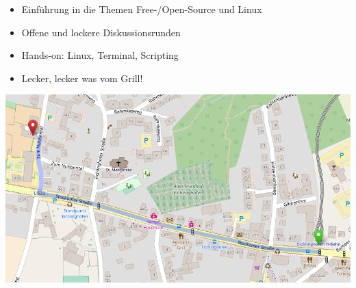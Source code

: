\documentclass{beamer}
\begin{document}
\begin{frame}
		{ \scriptsize
			\begin{minipage}{0.56\linewidth}
				\begin{itemize}
					\item Einführung in die Themen Free-/Open-Source und Linux
					\item Offene und lockere Diskussionsrunden
					\item Hands-on: Linux, Terminal, Scripting
					\item Lecker, lecker was vom Grill!
				\end{itemize}
			\end{minipage}
		}	
		\begin{minipage}{0.35\linewidth}
			\includegraphics[scale=0.23]{map}
		\end{minipage}
	\end{frame}
\end{document}
